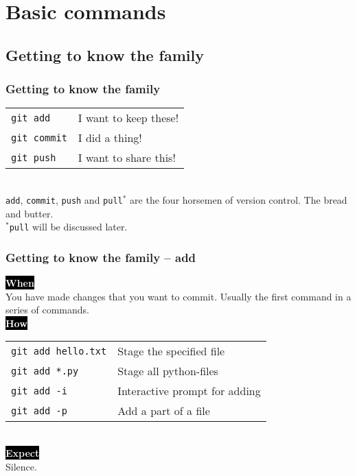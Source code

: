 \documentclass{beamer}
\newcommand{\keyword}[1]{\hspace{-1.0em}\colorbox{black}{\textcolor{white}{\textbf{#1}}}}
\begin{document}
\section{Basic commands}
\subsection{Getting to know the family}


\begin{frame}[fragile]
  \frametitle{Getting to know the family}

  \begin{tabular}{ll}
    \texttt{git add} & I want to keep these! \\
    \texttt{git commit} & I did a thing! \\
    \texttt{git push} & I want to share this! \\ %
  \end{tabular}
  \\ [2.0em]

  \texttt{add}, \texttt{commit}, \texttt{push} and \texttt{pull}$^*$
  are the four horsemen of version control. The bread and butter.
  \\ [2.0em]

  \small $^*$\texttt{pull} will be discussed later.

\end{frame}

\begin{frame}
  \frametitle{Getting to know the family -- add}
  \keyword{When}\\
    You have made changes that you want to commit.
    Usually the first command in a series of commands.
  \\ [0.5em]

  \keyword{How}\\
  \hspace{-1.0em}
  \begin{tabular}{ll}
    \texttt{git add hello.txt} & Stage the specified file \\
    \texttt{git add *.py} & Stage all python-files \\
    \texttt{git add -i} & Interactive prompt for adding \\
    \texttt{git add -p} & Add a part of a file \\
  \end{tabular}
  \\ [0.5em]

  \keyword{Expect}\\
  Silence.
\end{frame}
\end{document}
